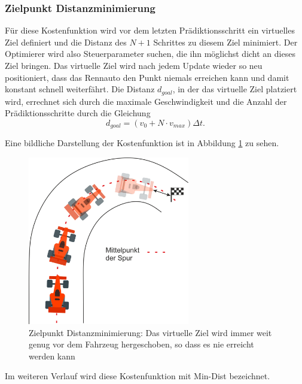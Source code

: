 \documentclass{like}
\begin{document}
\subsubsection*{Zielpunkt Distanzminimierung}
Für diese Kostenfunktion wird vor dem letzten Prädiktionsschritt ein virtuelles Ziel definiert und die Distanz des $N+1$ Schrittes zu diesem Ziel minimiert. Der Optimierer wird also Steuerparameter suchen, die ihn möglichst dicht an dieses Ziel bringen. Das virtuelle Ziel wird nach jedem Update wieder so neu positioniert, dass das Rennauto den Punkt niemals erreichen kann und damit konstant schnell weiterfährt. Die Distanz $d_{goal}$, in der das virtuelle Ziel platziert wird, errechnet sich durch die maximale Geschwindigkeit und die Anzahl der Prädiktionsschritte durch die Gleichung 
\begin{equation}
d_{goal} = \left(v_0 + N \cdot v_{max} \right) \Delta t.
\end{equation}


Eine bildliche Darstellung der Kostenfunktion ist in Abbildung \ref{fig:costGoalDist} zu sehen. 

\begin{figure}[ht!]
	\centering
	\includegraphics[width=200pt]{Abbildungen/costGoalDist.png}
	\caption{Zielpunkt Distanzminimierung: Das virtuelle Ziel wird immer weit genug vor dem Fahrzeug hergeschoben, so dass es nie erreicht werden kann}
	\label{fig:costGoalDist}
\end{figure}
Im weiteren Verlauf wird diese Kostenfunktion mit Min-Dist bezeichnet.
\end{document}
